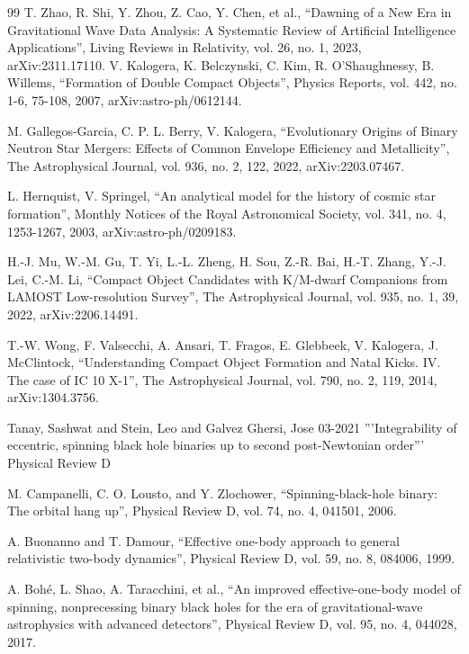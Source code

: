 \documentclass[12pt]{article}
\begin{document}
\begin{thebibliography}{99}
  T. Zhao, R. Shi, Y. Zhou, Z. Cao, Y. Chen, et al.,
  ``Dawning of a New Era in Gravitational Wave Data Analysis: A Systematic Review of Artificial Intelligence Applications'',
  Living Reviews in Relativity, vol. 26, no. 1, 2023,
  arXiv:2311.17110.
  V. Kalogera, K. Belczynski, C. Kim, R. O'Shaughnessy, B. Willems,
  ``Formation of Double Compact Objects'',
  Physics Reports, vol. 442, no. 1-6, 75-108, 2007,
  arXiv:astro-ph/0612144.

  M. Gallegos-Garcia, C. P. L. Berry, V. Kalogera,
  ``Evolutionary Origins of Binary Neutron Star Mergers: Effects of Common Envelope Efficiency and Metallicity'',
  The Astrophysical Journal, vol. 936, no. 2, 122, 2022,
  arXiv:2203.07467.

  L. Hernquist, V. Springel,
  ``An analytical model for the history of cosmic star formation'',
  Monthly Notices of the Royal Astronomical Society, vol. 341, no. 4, 1253-1267, 2003,
  arXiv:astro-ph/0209183.

  H.-J. Mu, W.-M. Gu, T. Yi, L.-L. Zheng, H. Sou, Z.-R. Bai, H.-T. Zhang, Y.-J. Lei, C.-M. Li,
  ``Compact Object Candidates with K/M-dwarf Companions from LAMOST Low-resolution Survey'',
  The Astrophysical Journal, vol. 935, no. 1, 39, 2022,
  arXiv:2206.14491.

  T.-W. Wong, F. Valsecchi, A. Ansari, T. Fragos, E. Glebbeek, V. Kalogera, J. McClintock,
  ``Understanding Compact Object Formation and Natal Kicks. IV. The case of IC 10 X-1'',
  The Astrophysical Journal, vol. 790, no. 2, 119, 2014,
  arXiv:1304.3756.


Tanay, Sashwat and Stein, Leo and Galvez Ghersi, Jose
03-2021
'''Integrability of eccentric, spinning black hole binaries up to second post-Newtonian order'''
Physical Review D

M. Campanelli, C. O. Lousto, and Y. Zlochower,
``Spinning-black-hole binary: The orbital hang up'',
Physical Review D, vol. 74, no. 4, 041501, 2006.

  A. Buonanno and T. Damour,
  ``Effective one-body approach to general relativistic two-body dynamics'',
  Physical Review D, vol. 59, no. 8, 084006, 1999.


  A. Bohé, L. Shao, A. Taracchini, et al.,
  ``An improved effective-one-body model of spinning, nonprecessing binary black holes for the era of gravitational-wave astrophysics with advanced detectors'',
  Physical Review D, vol. 95, no. 4, 044028, 2017.


\end{thebibliography}
\end{document}
